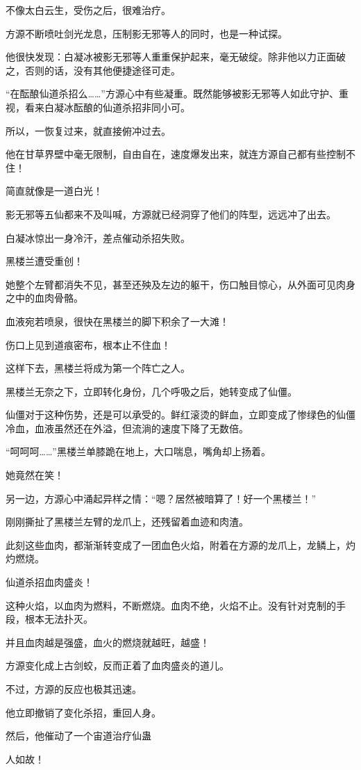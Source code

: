 \begin{this_body}
不像太白云生，受伤之后，很难治疗。

方源不断喷吐剑光龙息，压制影无邪等人的同时，也是一种试探。

他很快发现：白凝冰被影无邪等人重重保护起来，毫无破绽。除非他以力正面破之，否则的话，没有其他便捷途径可走。

“在酝酿仙道杀招么……”方源心中有些凝重。既然能够被影无邪等人如此守护、重视，看来白凝冰酝酿的仙道杀招非同小可。

所以，一恢复过来，就直接俯冲过去。

他在甘草界壁中毫无限制，自由自在，速度爆发出来，就连方源自己都有些控制不住！

简直就像是一道白光！

影无邪等五仙都来不及叫喊，方源就已经洞穿了他们的阵型，远远冲了出去。

白凝冰惊出一身冷汗，差点催动杀招失败。

黑楼兰遭受重创！

她整个左臂都消失不见，甚至还殃及左边的躯干，伤口触目惊心，从外面可见肉身之中的血肉骨骼。

血液宛若喷泉，很快在黑楼兰的脚下积余了一大滩！

伤口上见到道痕密布，根本止不住血！

这样下去，黑楼兰将成为第一个阵亡之人。

黑楼兰无奈之下，立即转化身份，几个呼吸之后，她转变成了仙僵。

仙僵对于这种伤势，还是可以承受的。鲜红滚烫的鲜血，立即变成了惨绿色的仙僵冷血，血液虽然还在外溢，但流淌的速度下降了无数倍。

“呵呵呵……”黑楼兰单膝跪在地上，大口喘息，嘴角却上扬着。

她竟然在笑！

另一边，方源心中涌起异样之情：“嗯？居然被暗算了！好一个黑楼兰！”

刚刚撕扯了黑楼兰左臂的龙爪上，还残留着血迹和肉渣。

此刻这些血肉，都渐渐转变成了一团血色火焰，附着在方源的龙爪上，龙鳞上，灼灼燃烧。

仙道杀招血肉盛炎！

这种火焰，以血肉为燃料，不断燃烧。血肉不绝，火焰不止。没有针对克制的手段，根本无法扑灭。

并且血肉越是强盛，血火的燃烧就越旺，越盛！

方源变化成上古剑蛟，反而正着了血肉盛炎的道儿。

不过，方源的反应也极其迅速。

他立即撤销了变化杀招，重回人身。

然后，他催动了一个宙道治疗仙蛊

人如故！

\end{this_body}

